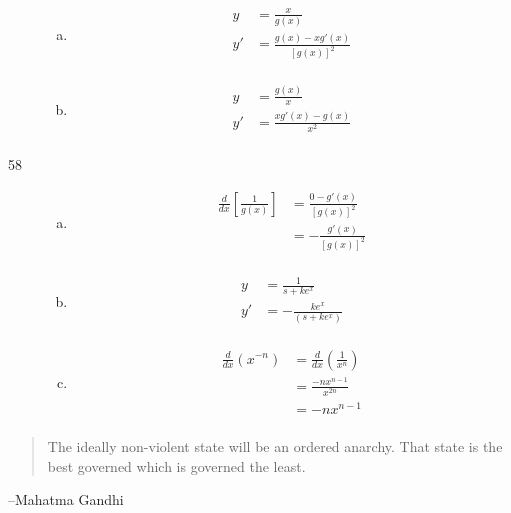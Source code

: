 \documentclass[letterpaper, landscape]{exam}
\begin{document}
\begin{description}
\begin{enumerate}[(a)]
        \item 
          \begin{align*}
            y  & = \frac{x}{g(x)} \\
            y' & = \boxed{ \frac{g(x) - x g'(x)}{[g(x)]^2} } \\
          \end{align*}

        \item 
          \begin{align*}
            y  & = \frac{g(x)}{x} \\
            y' & = \boxed{ \frac{x g'(x) - g(x)}{x^2} } \\
          \end{align*}

      \end{enumerate}

    \item[58]
      \begin{enumerate}[(a)]
        \item 
          \begin{align*}
            \frac{d}{dx} \left[ \frac{1}{g(x)} \right] 
              & = \frac{0 - g'(x)}{[g(x)]^2} \\
              & = - \frac{g'(x)}{[g(x)]^2} \\
          \end{align*}

        \item 
          \begin{align*}
            y  & = \frac{1}{s + k e^x} \\
            y' & = - \frac{k e^x}{ \left( s + k e^x \right)} \\
          \end{align*}

        \item
          \begin{align*}
            \frac{d}{dx} \left( x^{-n} \right) 
              & = \frac{d}{dx} \left( \frac{1}{x^n} \right) \\
              & = \frac{- n x^{n - 1}}{x^{2n}} \\
              & = - n x^{n - 1} \\
          \end{align*}
      \end{enumerate}

   \end{description}
 
  \else
    \vspace{10 cm}
    \begin{quote}
      \begin{em}
        The ideally non-violent state will be an ordered anarchy. That state is
        the best governed which is governed the least.
      \end{em}
    \end{quote}
    \hspace{2 cm} --Mahatma Gandhi
  \fi
\end{document}
